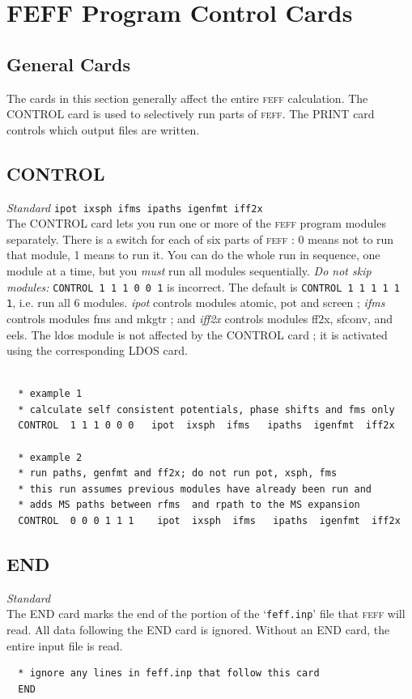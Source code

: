 \documentclass[11pt,oneside]{report} %
\newcommand{\program}[1]{\textsc{#1}}
\newcommand{\feff}{\program{feff}}
\newenvironment{Card}[4]%
      {\vspace{3ex}%
        \subsection{#1}
        \quad\textsl{#3}\newline
        \quad\texttt{#2}\newline%
        \label{card:#4}\\}
      {}
\newcommand{\file}[1]{`\texttt{#1}'}
\begin{document}
\section{FEFF Program Control Cards}
\label{sec:FEFF-Program-Control-Cards}


\subsection{General Cards}
\label{sec:General-Cards}

The cards in this section generally affect the entire {\feff} calculation.
The CONTROL card is used to selectively run parts of {\feff}. The PRINT card controls which
output files are written.



\begin{Card}{CONTROL}{ipot ixsph ifms ipaths igenfmt iff2x}{Standard}{con}
  The CONTROL card lets you run one or more of the {\feff} program modules separately.
  There is a switch for each of six parts of {\feff} : 0 means not to run that module, 1
  means to run it. You can do the whole run in sequence, one module
  at a time, but you \emph{must} run all modules sequentially.
  \emph{Do not skip modules:} \hbox{\texttt{CONTROL 1 1 1 0 0 1}}
  is incorrect. The default is \hbox{\texttt{CONTROL 1 1 1 1 1 1}},
  i.e. run all 6 modules.  {\it ipot} controls modules atomic, pot and screen ; {\it ifms} controls
  modules fms and mkgtr ; and {\it iff2x} controls modules ff2x, sfconv, and eels.  The ldos module
  is not affected by the CONTROL card ; it is activated using the corresponding LDOS card.
\begin{verbatim}

  * example 1
  * calculate self consistent potentials, phase shifts and fms only
  CONTROL  1 1 1 0 0 0   ipot  ixsph  ifms   ipaths  igenfmt  iff2x

  * example 2
  * run paths, genfmt and ff2x; do not run pot, xsph, fms
  * this run assumes previous modules have already been run and
  * adds MS paths between rfms  and rpath to the MS expansion
  CONTROL  0 0 0 1 1 1    ipot  ixsph  ifms   ipaths  igenfmt  iff2x
\end{verbatim}

\end{Card}



\begin{Card}{END}{}{Standard}{end}
  The END card marks the end of the portion of the \file{feff.inp} file
  that {\feff} will read. All data following the END card is ignored.
  Without an END card, the entire input file is read.
\begin{verbatim}
  * ignore any lines in feff.inp that follow this card
  END
\end{verbatim}
\end{Card}
\end{document}
